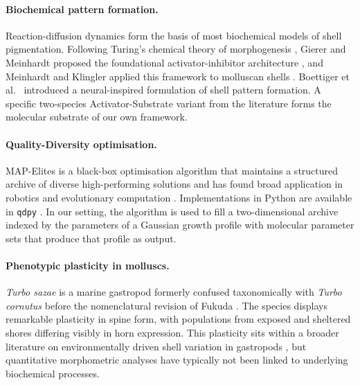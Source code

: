\paragraph{Biochemical pattern formation.} Reaction-diffusion dynamics form the basis of most biochemical models of shell pigmentation. Following Turing's chemical theory of morphogenesis \cite{turing1952chemical}, Gierer and Meinhardt proposed the foundational activator-inhibitor architecture \cite{gierer1972theory}, and Meinhardt and Klingler applied this framework to molluscan shells \cite{meinhardt1987model,fowler1992modeling,meinhardt1995algorithmic}. Boettiger et al.\ \cite{boettiger2009neural} introduced a neural-inspired formulation of shell pattern formation. A specific two-species Activator-Substrate variant from the literature \cite{fowler1992modeling} forms the molecular substrate of our own framework.

\paragraph{Quality-Diversity optimisation.} MAP-Elites \cite{mouret2015illuminating} is a black-box optimisation algorithm that maintains a structured archive of diverse high-performing solutions and has found broad application in robotics and evolutionary computation \cite{cully2015robots}. Implementations in Python are available in \texttt{qdpy} \cite{cazenille2018qdpy}. In our setting, the algorithm is used to fill a two-dimensional archive indexed by the parameters of a Gaussian growth profile with molecular parameter sets that produce that profile as output.

\paragraph{Phenotypic plasticity in molluscs.} \textit{Turbo sazae} is a marine gastropod formerly confused taxonomically with \textit{Turbo cornutus} before the nomenclatural revision of Fukuda \cite{fukuda2017nomenclature}. The species displays remarkable plasticity in spine form, with populations from exposed and sheltered shores differing visibly in horn expression. This plasticity sits within a broader literature on environmentally driven shell variation in gastropods \cite{tanaka2018phenotypic,hamm2008environmental}, but quantitative morphometric analyses have typically not been linked to underlying biochemical processes.
